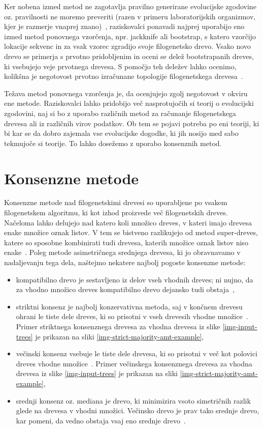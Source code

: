 \documentclass[a4paper, 12pt]{book}
\begin{document}
Ker nobena izmed metod ne zagotavlja pravilno generirane evolucijske zgodovine oz. pravilnosti ne moremo preveriti (razen v primeru laboratorijskih organizmov, kjer je razmerje vnaprej znano)~\cite{phy}, raziskovalci ponavadi najprej uporabijo eno izmed metod ponovnega vzorčenja, npr. jackknife ali bootstrap, s katero vzorčijo lokacije sekvenc in za vsak vzorec zgradijo svoje filogenetsko drevo. Vsako novo drevo se primerja s prvotno pridobljenim in oceni se delež bootstrapanih dreves, ki vsebujejo veje prvotnega drevesa. S pomočjo teh deležev lahko ocenimo, kolikšna je negotovost prvotno izračunane topologije filogenetskega drevesa~\cite{fel}.   

Težava metod ponovnega vzorčenja je, da ocenjujejo zgolj negotovost v okviru ene metode. Raziskovalci lahko pridobijo več nasprotujočih si teorij o evolucijski zgodovini, naj si bo z uporabo različnih metod za računanje filogenetskega drevesa ali iz različnih virov podatkov. Ob tem se pojavi potreba po eni teoriji, ki bi kar se da dobro zajemala vse evolucijske dogodke, ki jih nosijo med sabo tekmujoče si teorije. To lahko dosežemo z uporabo konsenznih metod.

\section{Konsenzne metode}
Konsenzne metode nad filogenetskimi drevesi so uporabljene po vsakem filogenetskem algoritmu, ki kot izhod proizvede več filogenetskih dreves. Načeloma lahko delujejo nad katero koli množico dreves, v kateri imajo drevesa enake množice oznak listov. V tem se bistveno razlikujejo od metod super-dreves, katere so sposobne kombinirati tudi drevesa, katerih množice oznak listov niso enake~\cite{bw}. Poleg metode asimetričnega srednjega drevesa, ki jo obravnavamo v nadaljevanju tega dela, naštejmo nekatere najbolj pogoste konsenzne metode:

\begin{itemize}
	\item kompatibilno drevo je sestavljeno iz delov vseh vhodnih dreves; ni nujno, da za vhodno množico dreves kompatibilno drevo dejansko tudi obstaja~\cite{pw},
	\item striktni konsenz je najbolj konzervativna metoda, saj v končnem drevesu ohrani le tiste dele dreves, ki so prisotni v vseh drevesih vhodne množice~\cite{bw}. Primer striktnega konsenznega drevesa za vhodna drevesa iz slike \ref{img-input-trees} je prikazan na sliki \ref{img-strict-majority-amt-example},
	\item večinski konsenz vsebuje le tiste dele drevesa, ki so prisotni v več kot polovici dreves vhodne množice~\cite{bw}. Primer večinskega konsenznega drevesa za vhodna drevesa iz slike \ref{img-input-trees} je prikazan na sliki \ref{img-strict-majority-amt-example},
	\item srednji konsenz oz. mediana je drevo, ki minimizira vsoto simetričnih razlik glede na drevesa v vhodni množici. Večinsko drevo je prav tako srednje drevo, kar pomeni, da vedno obstaja vsaj eno srednje drevo~\cite{pw}.
\end{itemize}
\end{document}
